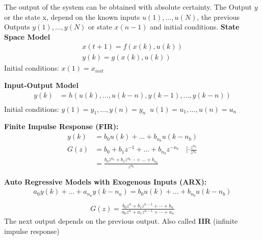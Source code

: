 \begin{tcolorbox}[colback=green!5!white,colframe=green!75!black,title=\textbf{Deterministic Model}]
	The output of the system can be obtained with absolute certainty. The Output $y$ or the state x, depend on the known inputs $u(1), \dots, u(N)$, the previous Outputs $y(1), \dots, y(N)$ or state $x(n-1)$ and initial conditions.  
	\textbf{State Space Model}
	\begin{align*}
	x(t+1) = f(x(k), u(k))\\
	y(k) = g(x(k), u(k))
	\end{align*}
	Initial conditions: $x(1) = x_{init}$
	
	\textbf{Input-Output Model}
	\begin{align*}
	y(k) &= h(u(k), ..., u(k-n), y(k-1), ..., y(k-n))\\
	\end{align*}
	Initial conditions: $y(1) = y_1,\dots,y(n) = y_n  \;\; u(1)= u_1,\dots,u(n) = u_n$
	
	
	\textbf{Finite Impulse Response (FIR): } 
	\begin{align*}
		y(k) &= b_0 u(k) + ... + b_{n_b} u(k-n_b) \\
		G(z) &= b_0 + b_1z^{-1} + ... + b_{n_b}z^{-n_b} \quad | \cdot \frac{z^{n_b}}{z^{n_b}} \\
		&= \frac{b_0 z^{n_b} + b_1 z^{ n_{b-1} } + ... + b_{n_b} }{z^{n_b}}
	\end{align*}
	
	\textbf{Auto Regressive Models with Exogenous Inputs (ARX): }
	\begin{align*}
		a_0y(k)+\dots+a_{n_a}y(k-n_a) = b_0u(k) + \dots+b_{n_b}u(k-n_b)\\
	\end{align*}
	\begin{align*}
	G(z) = \frac{b_0z^n + b_1z^{n-1} + \cdots + b_n}{a_0z^n + a_1z^{n-1} + \cdots + a_n}
	\end{align*}
	The next output depends on the previous output. Also called \textbf{IIR} (infinite impulse response)
	
\end{tcolorbox}		

